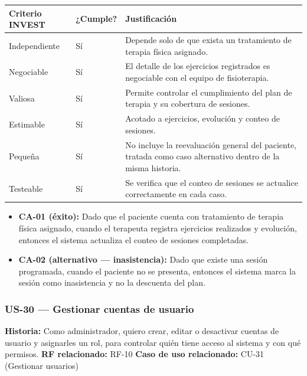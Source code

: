 \documentclass[11pt,a4paper]{article}
\providecommand{\tightlist}{%
	\setlength{\itemsep}{0pt}\setlength{\parskip}{0pt}}
\begin{document}
	\begin{longtable}{p{} p{} p{}}
		\toprule
		\textbf{Criterio INVEST} & \textbf{¿Cumple?} & \textbf{Justificación} \\
		\midrule
		\endhead
		Independiente & Sí & Depende solo de que exista un tratamiento de terapia física asignado. \\
		Negociable & Sí & El detalle de los ejercicios registrados es negociable con el equipo de fisioterapia. \\
		Valiosa & Sí & Permite controlar el cumplimiento del plan de terapia y su cobertura de sesiones. \\
		Estimable & Sí & Acotado a ejercicios, evolución y conteo de sesiones. \\
		Pequeña & Sí & No incluye la reevaluación general del paciente, tratada como caso alternativo dentro de la misma historia. \\
		Testeable & Sí & Se verifica que el conteo de sesiones se actualice correctamente en cada caso. \\
		\bottomrule
	\end{longtable}
	
	\begin{itemize}
		\tightlist
		\item \textbf{CA-01 (éxito):} Dado que el paciente cuenta con tratamiento de terapia física asignado, cuando el terapeuta registra ejercicios realizados y evolución, entonces el sistema actualiza el conteo de sesiones completadas.
		\item \textbf{CA-02 (alternativo --- inasistencia):} Dado que existe una sesión programada, cuando el paciente no se presenta, entonces el sistema marca la sesión como inasistencia y no la descuenta del plan.
	\end{itemize}
	
	\subsubsection{US-30 --- Gestionar cuentas de usuario}
	
	\textbf{Historia:} Como administrador, quiero crear, editar o desactivar cuentas de usuario y asignarles un rol, para controlar quién tiene acceso al sistema y con qué permisos.
	\textbf{RF relacionado:} RF-10
	\textbf{Caso de uso relacionado:} CU-31 (Gestionar usuarios)
	
\end{document}
